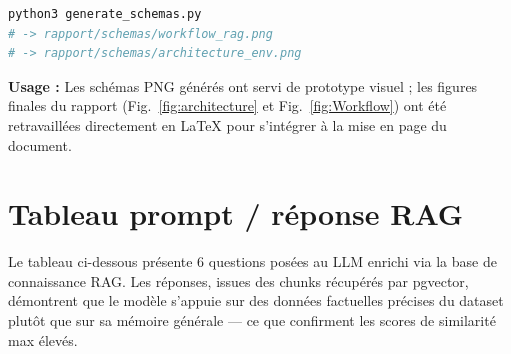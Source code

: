\documentclass[12pt,a4paper]{report}
\begin{document}
\begin{lstlisting}[language=bash]
python3 generate_schemas.py
# -> rapport/schemas/workflow_rag.png
# -> rapport/schemas/architecture_env.png
\end{lstlisting}

\begin{captionbox}
\textbf{Usage :} Les schémas PNG générés ont servi de prototype visuel ; les
figures finales du rapport (Fig.~\ref{fig:architecture} et Fig.~\ref{fig:Workflow})
ont été retravaillées directement en LaTeX pour s'intégrer à la mise en page
du document.
\end{captionbox}

\chapter{Tableau prompt / réponse RAG}

Le tableau ci-dessous présente 6 questions posées au LLM enrichi via la base de
connaissance RAG. Les réponses, issues des chunks récupérés par pgvector, démontrent
que le modèle s'appuie sur des données factuelles précises du dataset plutôt que
sur sa mémoire générale — ce que confirment les scores de similarité max élevés.
\end{document}
